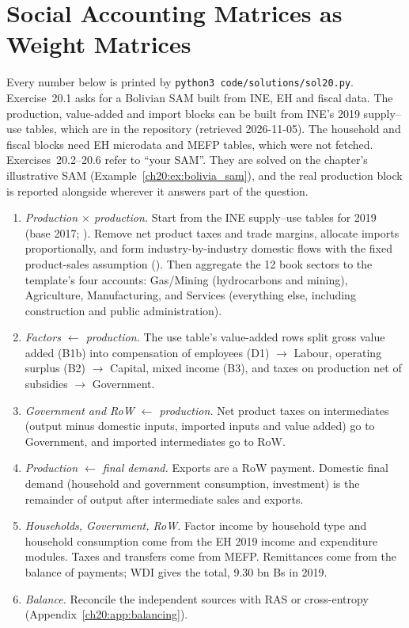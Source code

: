 \documentclass[../solutions_manual.tex]{subfiles}
\begin{document}
\ifSubfilesClassLoaded{\setcounter{chapter}{19}}{}%
\setcounter{chapter}{19}%
\chapter{Social Accounting Matrices as Weight Matrices}\label{sol20}

Every number below is printed by \texttt{python3 code/solutions/sol20.py}. Exercise~20.1 asks for a Bolivian SAM built from INE, EH and fiscal data. The production, value-added and import blocks can be built from INE's 2019 supply--use tables, which are in the repository (retrieved 2026-11-05). The household and fiscal blocks need EH microdata and MEFP tables, which were not fetched. Exercises~20.2--20.6 refer to ``your SAM''. They are solved on the chapter's illustrative SAM (Example~\ref{ch20:ex:bolivia_sam}), and the real production block is reported alongside wherever it answers part of the question.


\begin{enumerate}
\item \emph{Production $\times$ production.} Start from the INE supply--use tables for 2019 (base 2017; ). Remove net product taxes and trade margins, allocate imports proportionally, and form industry-by-industry domestic flows with the fixed product-sales assumption (). Then aggregate the 12 book sectors to the template's four accounts: Gas/Mining (hydrocarbons and mining), Agriculture, Manufacturing, and Services (everything else, including construction and public administration).
\item \emph{Factors $\leftarrow$ production.} The use table's value-added rows split gross value added (B1b) into compensation of employees (D1) $\to$ Labour, operating surplus (B2) $\to$ Capital, mixed income (B3), and taxes on production net of subsidies $\to$ Government.
\item \emph{Government and RoW $\leftarrow$ production.} Net product taxes on intermediates (output minus domestic inputs, imported inputs and value added) go to Government, and imported intermediates go to RoW.
\item \emph{Production $\leftarrow$ final demand.} Exports are a RoW payment. Domestic final demand (household and government consumption, investment) is the remainder of output after intermediate sales and exports.
\item \emph{Households, Government, RoW.} Factor income by household type and household consumption come from the EH 2019 income and expenditure modules. Taxes and transfers come from MEFP. Remittances come from the balance of payments; WDI gives the total, 9.30 bn Bs in 2019.
\item \emph{Balance.} Reconcile the independent sources with RAS or cross-entropy (Appendix~\ref{ch20:app:balancing}).
\end{enumerate}
\end{document}
